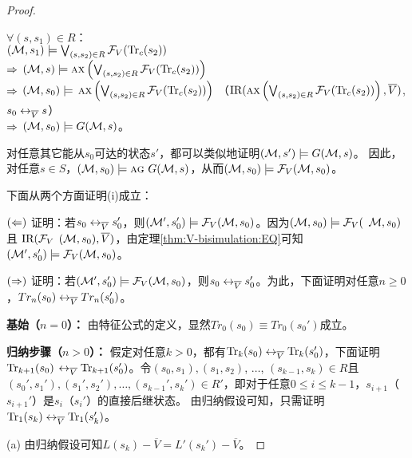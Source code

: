 \begin{proof}
\begin{itemize}
		$\forall (s, s_1) \in R$：\\
		$({\cal M}, s_1) \models \bigvee_{(s, s_2)\in R}{\cal F}_V(\textrm{Tr}_c(s_2))$\\
		$\Rightarrow$ $({\cal M}, s) \models \textsc{a} \textsc{x} \left( \bigvee_{(s, s_2)\in R} {\cal F}_V(\textrm{Tr}_c(s_2)) \right)$ \\
		$\Rightarrow$ $({\cal M}, s_0) \models$  $\textsc{a} \textsc{x} \left( \bigvee_{(s, s_2)\in R} {\cal F}_V(\textrm{Tr}_c(s_2)) \right)$     （$\textrm{IR}(\textsc{a} \textsc{x} \left( \bigvee_{(s, s_2)\in R} {\cal F}_V(\textrm{Tr}_c(s_2)) \right), \overline V)$, $s_0 \leftrightarrow_{\overline V} s$）\\
		$\Rightarrow$ $({\cal M}, s_0) \models G({\cal M}, s)$。\\
	\end{itemize}
	
	对任意其它能从$s_0$可达的状态$s'$，都可以类似地证明$({\cal M},s')\models G({\cal M}, s)$。
	因此，对任意$s\in S$，$({\cal M}, s_0) \models \textsc{a}\textsc{g}\ G({\cal M}, s)$，从而$({\cal M}, s_0) \models {\cal F}_V({\cal M}, s_0)$。
	
	下面从两个方面证明(i)成立：
	
	$(\Leftarrow)$ 证明：若$s_0 \leftrightarrow_{\overline V} s_0'$，则$({\cal M}',s_0') \models {\cal F}_V({\cal M},s_0)$。因为$({\cal M}, s_0) \models {\cal F}_V($ ${\cal M}, s_0)$且 $\textrm{IR}({\cal F}_V$ $({\cal M}, s_0), \overline V)$，由定理\ref{thm:V-bisimulation:EQ}可知
	$({\cal M}',s_0') \models {\cal F}_V({\cal M},s_0)$。
	
	$(\Rightarrow)$ 证明：若$({\cal M}',s_0') \models {\cal F}_V({\cal M},s_0)$，则$s_0 \leftrightarrow_{\overline V} s_0'$。为此，下面证明对任意$n \geq 0$，$Tr_n(s_0) \leftrightarrow_{\overline V} Tr_n(s_0')$。
	
	
	\textbf{基始（$n=0$）：} 由特征公式的定义，显然$Tr_0(s_0) \equiv Tr_0(s_0')$成立。
	
	\textbf{归纳步骤（$n>0$）：} 假定对任意$k > 0$，都有$\textrm{Tr}_k(s_0) \leftrightarrow_{\overline V} \textrm{Tr}_k(s_0')$，下面证明$\textrm{Tr}_{k+1}(s_0)$ $\leftrightarrow_{\overline V} \textrm{Tr}_{k+1}(s_0')$。令$(s_0, s_1), (s_1, s_2)$, $\dots$, $(s_{k-1}, s_k) \in R$且$(s_0', s_1'), (s_1', s_2'), \dots, (s_{k-1}', s_k') \in R'$，即对于任意$0 \leq i \leq k-1$，$s_{i+1}$（$s_{i+1}'$）是$s_i$（$s_i'$）的直接后继状态。
	由归纳假设可知，只需证明$\textrm{Tr}_1(s_k) \leftrightarrow_{\overline V} \textrm{Tr}_1(s_k')$。
	
	(a) 由归纳假设可知$L(s_k) - \overline V = L'(s_k') - \overline V$。
	

\end{proof}
